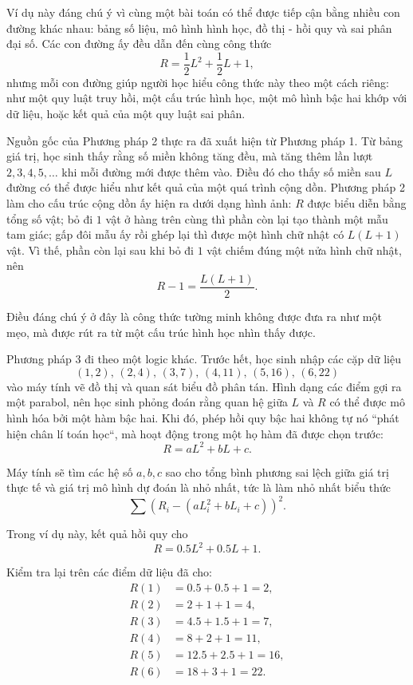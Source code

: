   {
    \vspace{.5\baselineskip}
    Ví dụ này đáng chú ý vì cùng một bài toán có thể được tiếp cận bằng nhiều con đường khác nhau: bảng số liệu, mô hình hình học, đồ thị - hồi quy và sai phân đại số. Các con đường ấy đều dẫn đến cùng công thức
    $$
      R=\frac12L^2+\frac12L+1,
    $$
    nhưng mỗi con đường giúp người học hiểu công thức này theo một cách riêng: như một quy luật truy hồi, một cấu trúc hình học, một mô hình bậc hai khớp với dữ liệu, hoặc kết quả của một quy luật sai phân.

    Nguồn gốc của Phương pháp 2 thực ra đã xuất hiện từ Phương pháp 1. Từ bảng giá trị, học sinh thấy rằng số miền không tăng đều, mà tăng thêm lần lượt $2,3,4,5,\dots$ khi mỗi đường mới được thêm vào. Điều đó cho thấy số miền sau $L$ đường có thể được hiểu như kết quả của một quá trình cộng dồn. Phương pháp 2 làm cho cấu trúc cộng dồn ấy hiện ra dưới dạng hình ảnh: $R$ được biểu diễn bằng tổng số vật; bỏ đi $1$ vật ở hàng trên cùng thì phần còn lại tạo thành một mẫu tam giác; gấp đôi mẫu ấy rồi ghép lại thì được một hình chữ nhật có $L(L+1)$ vật. Vì thế, phần còn lại sau khi bỏ đi $1$ vật chiếm đúng một nửa hình chữ nhật, nên
    $$
      R-1=\frac{L(L+1)}{2}.
    $$

    Điều đáng chú ý ở đây là công thức tường minh không được đưa ra như một mẹo, mà được rút ra từ một cấu trúc hình học nhìn thấy được.

    Phương pháp 3 đi theo một logic khác. Trước hết, học sinh nhập các cặp dữ liệu
    $$
      (1,2),\, (2,4),\, (3,7),\, (4,11),\, (5,16),\, (6,22)
    $$
    vào máy tính vẽ đồ thị và quan sát biểu đồ phân tán. Hình dạng các điểm gợi ra một parabol, nên học sinh phỏng đoán rằng quan hệ giữa $L$ và $R$ có thể được mô hình hóa bởi một hàm bậc hai. Khi đó, phép hồi quy bậc hai không tự nó ``phát hiện chân lí toán học``, mà hoạt động trong một họ hàm đã được chọn trước:
    $$
      R=aL^2+bL+c.
    $$

    Máy tính sẽ tìm các hệ số $a,b,c$ sao cho tổng bình phương sai lệch giữa giá trị thực tế và giá trị mô hình dự đoán là nhỏ nhất, tức là làm nhỏ nhất biểu thức
    $$
      \sum \left(R_i-(aL_i^2+bL_i+c)\right)^2.
    $$

    Trong ví dụ này, kết quả hồi quy cho
    $$
      R=0.5L^2+0.5L+1.
    $$

    Kiểm tra lại trên các điểm dữ liệu đã cho:
    \begin{align*}
      R(1)&=0.5+0.5+1=2,\\
      R(2)&=2+1+1=4,\\
      R(3)&=4.5+1.5+1=7,\\
      R(4)&=8+2+1=11,\\
      R(5)&=12.5+2.5+1=16,\\
      R(6)&=18+3+1=22.
    \end{align*}

}
